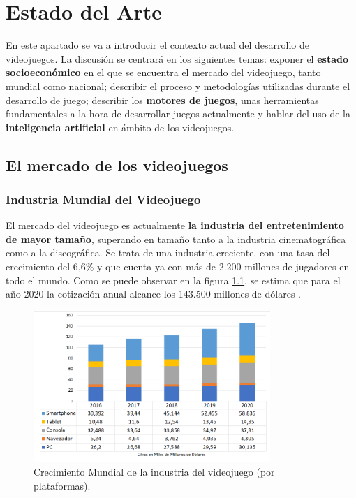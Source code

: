 \chapter{Estado del Arte}
\label{chap:estado del arte}
En este apartado se va a introducir el contexto actual del desarrollo de videojuegos. La discusión se centrará en los siguientes temas: exponer el \textbf{estado socioeconómico} en el que se encuentra el mercado del videojuego, tanto mundial como nacional; describir el proceso y metodologías utilizadas durante el desarrollo de juego; describir los \textbf{motores de juegos}, unas herramientas fundamentales a la hora de desarrollar juegos actualmente y hablar del uso de la \textbf{inteligencia artificial} en ámbito de los videojuegos.
 
\section{El mercado de los videojuegos}
\subsection{Industria Mundial del Videojuego}
El mercado del videojuego es actualmente \textbf{la industria del entretenimiento de mayor tamaño}, superando en tamaño tanto a la industria cinematográfica como a la discográfica. Se trata de una industria creciente, con una tasa del crecimiento del 6,6\% y que cuenta ya con más de 2.200 millones de jugadores en todo el mundo. Como se puede observar en la figura \ref{crecimiento_mercado_plataforma}, se estima que para el año 2020 la cotización anual alcance los 143.500 millones de dólares \cite{libro_blanco}.

\begin{figure}[h]
    \centering
    \includegraphics[width=0.8\textwidth]{images/estadodelarte/mercado/crecimiento_mercado_plataforma}
    \caption{Crecimiento Mundial de la industria del videojuego (por plataformas).}
    \label{crecimiento_mercado_plataforma}
\end{figure}

